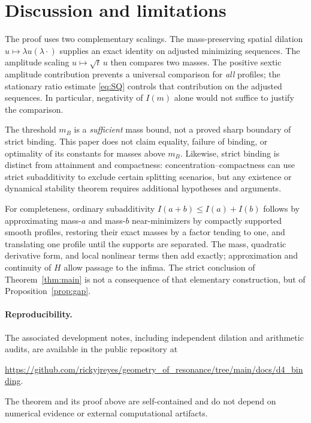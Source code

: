\documentclass[11pt,letterpaper]{article}
\numberwithin{equation}{section}
\begin{document}
\section{Discussion and limitations}

The proof uses two complementary scalings. The mass-preserving spatial dilation $u\mapsto\lambda u(\lambda\cdot)$ supplies an exact identity on adjusted minimizing sequences. The amplitude scaling $u\mapsto\sqrt t\,u$ then compares two masses. The positive sextic amplitude contribution prevents a universal comparison for \emph{all} profiles; the stationary ratio estimate \eqref{eq:SQ} controls that contribution on the adjusted sequences. In particular, negativity of $I(m)$ alone would not suffice to justify the comparison.

The threshold $m_B$ is a \emph{sufficient} mass bound, not a proved sharp boundary of strict binding. This paper does not claim equality, failure of binding, or optimality of its constants for masses above $m_B$. Likewise, strict binding is distinct from attainment and compactness: concentration--compactness can use strict subadditivity to exclude certain splitting scenarios, but any existence or dynamical stability theorem requires additional hypotheses and arguments.

For completeness, ordinary subadditivity $I(a+b)\le I(a)+I(b)$ follows by approximating mass-$a$ and mass-$b$ near-minimizers by compactly supported smooth profiles, restoring their exact masses by a factor tending to one, and translating one profile until the supports are separated. The mass, quadratic derivative form, and local nonlinear terms then add exactly; approximation and continuity of $H$ allow passage to the infima. The strict conclusion of Theorem~\ref{thm:main} is not a consequence of that elementary construction, but of Proposition~\ref{prop:gap}.

\paragraph{Reproducibility.}
The associated development notes, including independent dilation and arithmetic audits, are available in the public repository at
\begin{center}
\small\url{https://github.com/rickyjreyes/geometry_of_resonance/tree/main/docs/d4_binding}.
\end{center}
The theorem and its proof above are self-contained and do not depend on numerical evidence or external computational artifacts.
\end{document}
